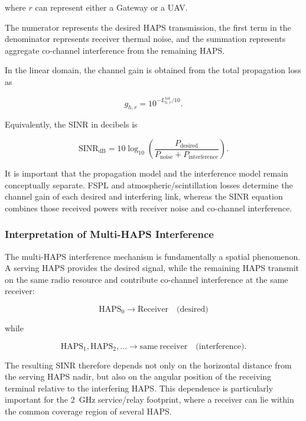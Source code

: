 \documentclass[conference]{IEEEtran}
\begin{document}
where $r$ can represent either a Gateway or a UAV.

The numerator represents the desired HAPS transmission, the first term in the denominator represents receiver thermal noise, and the summation represents aggregate co-channel interference from the remaining HAPS.

In the linear domain, the channel gain is obtained from the total propagation loss as

\begin{equation}
g_{h,r}
= 10^{-L_{h,r}^{\mathrm{tot}}/10}.
\end{equation}

Equivalently, the SINR in decibels is

\begin{equation}
\mathrm{SINR}_{\mathrm{dB}}
=
10\log_{10}
\left(
\frac{P_{\mathrm{desired}}}
{P_{\mathrm{noise}}+P_{\mathrm{interference}}}
\right).
\end{equation}

It is important that the propagation model and the interference model remain conceptually separate. FSPL and atmospheric/scintillation losses determine the channel gain of each desired and interfering link, whereas the SINR equation combines those received powers with receiver noise and co-channel interference.

\subsubsection{Interpretation of Multi-HAPS Interference}

The multi-HAPS interference mechanism is fundamentally a spatial phenomenon. A serving HAPS provides the desired signal, while the remaining HAPS transmit on the same radio resource and contribute co-channel interference at the same receiver:

\begin{equation}
\mathrm{HAPS}_0
\rightarrow
\mathrm{Receiver}
\quad\text{(desired)}
\end{equation}

while

\begin{equation}
\mathrm{HAPS}_1,\mathrm{HAPS}_2,\ldots
\rightarrow
\mathrm{same\ receiver}
\quad\text{(interference)}.
\end{equation}

The resulting SINR therefore depends not only on the horizontal distance from the serving HAPS nadir, but also on the angular position of the receiving terminal relative to the interfering HAPS. This dependence is particularly important for the 2~GHz service/relay footprint, where a receiver can lie within the common coverage region of several HAPS.
\end{document}
